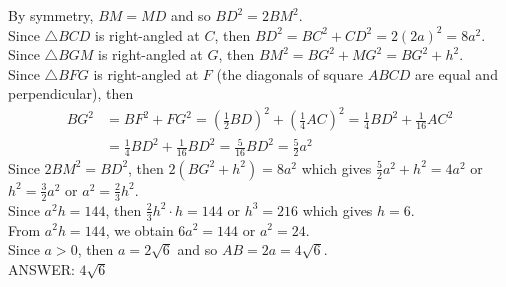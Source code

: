 \documentclass{article}
\begin{document}
By symmetry, $B M=M D$ and so $B D^2=2 B M^2$.\\
Since $\triangle B C D$ is right-angled at $C$, then $B D^2=B C^2+C D^2=2(2 a)^2=8 a^2$.\\
Since $\triangle B G M$ is right-angled at $G$, then $B M^2=B G^2+M G^2=B G^2+h^2$.\\
Since $\triangle B F G$ is right-angled at $F$ (the diagonals of square $A B C D$ are equal and perpendicular), then
$$
\begin{aligned}
    BG^2 & =B F^2+F G^2=\left(\frac{1}{2} B D\right)^2+\left(\frac{1}{4} A C\right)^2=\frac{1}{4} B D^2+\frac{1}{16} A C^2\\
& =\frac{1}{4} B D^2+\frac{1}{16} B D^2=\frac{5}{16} B D^2=\frac{5}{2} a^2
\end{aligned}
$$
Since $2 B M^2=B D^2$, then $2\left(B G^2+h^2\right)=8 a^2$ which gives $\frac{5}{2} a^2+h^2=4 a^2$ or $h^2=\frac{3}{2} a^2$ or $a^2=\frac{2}{3} h^2$.\\
Since $a^2 h=144$, then $\frac{2}{3} h^2 \cdot h=144$ or $h^3=216$ which gives $h=6$.\\
From $a^2 h=144$, we obtain $6 a^2=144$ or $a^2=24$.\\
Since $a>0$, then $a=2 \sqrt{6}$ and so $A B=2 a=4 \sqrt{6}$.\\
ANSWER: $\boxed{4 \sqrt{6}}$

\pagebreak
\end{document}
